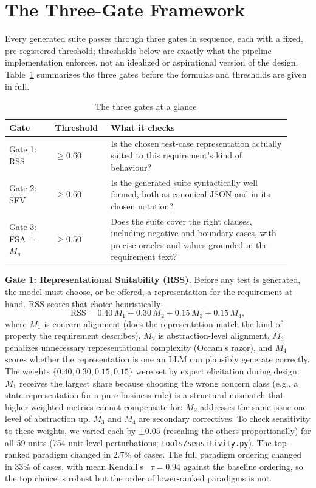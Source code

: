 \documentclass[conference]{IEEEtran}
\begin{document}
\section{The Three-Gate Framework}
\label{sec:framework}

Every generated suite passes through three gates in sequence, each with a
fixed, pre-registered threshold; thresholds below are exactly what the
pipeline implementation enforces, not an idealized or aspirational version of
the design. Table~\ref{tab:gates} summarizes the three gates before the
formulas and thresholds are given in full.

\begin{table}[t]
\centering
\caption{The three gates at a glance}
\label{tab:gates}
\small
\begin{tabular}{@{}p{0.15\linewidth}p{0.18\linewidth}p{0.59\linewidth}@{}}
\toprule
\textbf{Gate} & \textbf{Threshold} & \textbf{What it checks} \\
\midrule
Gate 1: RSS & $\geq 0.60$ & Is the chosen test-case representation actually suited to this requirement's kind of behaviour? \\
Gate 2: SFV & $\geq 0.60$ & Is the generated suite syntactically well formed, both as canonical JSON and in its chosen notation? \\
Gate 3: FSA + $M_g$ & $\geq 0.50$ & Does the suite cover the right clauses, including negative and boundary cases, with precise oracles and values grounded in the requirement text? \\
\bottomrule
\end{tabular}
\end{table}

\textbf{Gate 1: Representational Suitability (RSS).} Before any test is
generated, the model must choose, or be offered, a representation for the
requirement at hand. RSS scores that choice heuristically:
\begin{equation}
\mathrm{RSS} = 0.40\,M_1 + 0.30\,M_2 + 0.15\,M_3 + 0.15\,M_4,
\end{equation}
where $M_1$ is concern alignment (does the representation match the kind of
property the requirement describes), $M_2$ is abstraction-level alignment,
$M_3$ penalizes unnecessary representational complexity (Occam's razor), and
$M_4$ scores whether the representation is one an LLM can plausibly generate
correctly. The weights $\{0.40, 0.30, 0.15, 0.15\}$ were set by expert
elicitation during design: $M_1$ receives the largest share because choosing
the wrong concern class (e.g., a state representation for a pure business
rule) is a structural mismatch that higher-weighted metrics cannot compensate
for; $M_2$ addresses the same issue one level of abstraction up. $M_3$ and
$M_4$ are secondary correctives. To check sensitivity to these weights, we varied each by
$\pm0.05$ (rescaling the others proportionally) for all 59 units
(754 unit-level perturbations; \texttt{tools/sensitivity.py}). The top-ranked
paradigm changed in 2.7\% of cases. The full paradigm ordering changed in 33\%
of cases, with mean Kendall's~\cite{kendall1938} $\tau=0.94$ against the baseline ordering, so
the top choice is robust but the order of lower-ranked paradigms is not.
\end{document}
